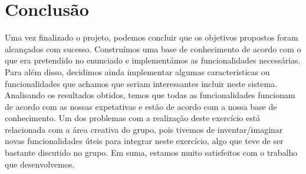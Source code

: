 \chapter{Conclusão}

Uma vez finalizado o projeto, podemos concluir que os objetivos propostos foram alcançados com sucesso. Construímos uma base de conhecimento de acordo com o que era pretendido no enunciado e implementámos as funcionalidades necessárias. Para além disso, decidimos ainda implementar algumas caracteristicas ou funcionalidades que achamos que seriam interessantes incluir neste sistema. Analisando os resultados obtidos, temos que todas as funcionalidades funcionam de acordo com as nossas expetativas e estão de acordo com a nossa base de conhecimento. Um dos problemas com a realização deste exercício está relacionada com a área creativa do grupo, pois tivemos de inventar/imaginar novas funcionalidades úteis para integrar neste exercício, algo que teve de ser bastante discutido no grupo. Em suma, estamos muito satisfeitos com o trabalho que desenvolvemos. 
